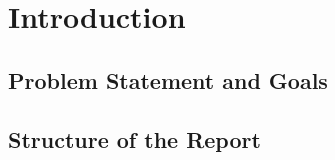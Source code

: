 
\chapter{Introduction}\label{cha:Introduction}

\section{Problem Statement and Goals}\label{sec:Aufgabenstellung}

\section{Structure of the Report}\label{sec:Structure}
